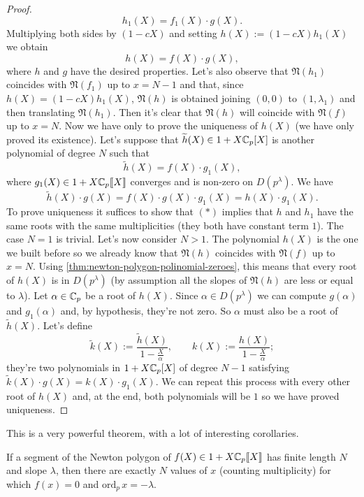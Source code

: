 \begin{proof}
			\[
				h_1(X) = f_1(X) \cdot g(X).
			\]
			Multiplying both sides by $(1 - cX)$ and setting $h(X) := (1 - cX)h_1(X)$ we obtain
			\[
				h(X) = f(X) \cdot g(X),
			\]
			where $h$ and $g$ have the desired properties. Let's also observe that $\mathfrak{N}(h_1)$ coincides with $\mathfrak{N}(f_1)$ up to $x = N-1$ and that, since $h(X) = (1 - cX)h_1(X)$, $\mathfrak{N}(h)$ is obtained joining $(0,0)$ to $(1, \lambda_1)$ and then translating $\mathfrak{N}(h_1)$. Then it's clear that $\mathfrak{N}(h)$ will coincide with $\mathfrak{N}(f)$ up to $x = N$.\newline 
			Now we have only to prove the uniqueness of $h(X)$ (we have only proved its existence).
			Let's suppose that $\widetilde{h}(X) \in 1 + X\mathbb{C}_p[X]$ is another polynomial of degree $N$ such that \[
				\tilde{h}(X) = f(X) \cdot g_1(X),
			\]
			where $g_1(X) \in 1 + X\mathbb{C}_p\llbracket {X} \rrbracket$ converges and is non-zero on $D(p^{\lambda})$. We have
			\[
				\tilde{h}(X)\cdot g(X) = f(X)\cdot g(X) \cdot g_1(X) = h(X) \cdot g_1(X). \tag{$*$}
			\]
			To prove uniqueness it suffices to show that $(*)$ implies that $h$ and $h_1$ have the same roots with the same multiplicities (they both have constant term $1$). The case $N=1$ is trivial. Let's now consider $N > 1$. The polynomial $h(X)$ is the one we built before so we already know that $\mathfrak{N}(h)$ coincides with $\mathfrak{N}(f)$ up to $x = N$. Using \cref{thm:newton-polygon-polinomial-zeroes}, this means that every root of $h(X)$ is in $D(p^{\lambda})$ (by assumption all the slopes of $\mathfrak{N}(h)$ are less or equal to $\lambda$). Let $\alpha \in \mathbb{C}_p$ be a root of $h(X)$. Since $\alpha \in D(p^{\lambda})$ we can compute $g(\alpha)$ and $g_1(\alpha)$ and, by hypothesis, they're not zero. So $\alpha$ must also be a root of $\tilde{h}(X)$. Let's define 
			\[
				\tilde{k}(X) := \frac{\tilde{h}(X)}{1 - \frac{X}{\alpha}}, \qquad k(X) := \frac{h(X)}{1 - \frac{X}{\alpha}};
			\]
			they're two polynomials in $1 + X\mathbb{C}_p[X]$ of degree $N - 1$ satisfying $\tilde{k}(X)\cdot g(X) = k(X)\cdot g_1(X)$. We can repeat this process with every other root of $h(X)$ and, at the end, both polynomials will be $1$ so we have proved uniqueness.
		\end{proof}
		This is a very powerful theorem, with a lot of interesting corollaries.
		\begin{corollary}
			\label{corollary:newton-polygon-zeroes}
			If a segment of the Newton polygon of $f(X) \in 1 + X\mathbb{C}_p\llbracket {X} \rrbracket$ has finite length $N$ and slope $\lambda$, then there are exactly $N$ values of $x$ (counting multiplicity) for which $f(x) = 0$ and $\mathrm{ord}_p\, x = -\lambda$.
		\end{corollary}
